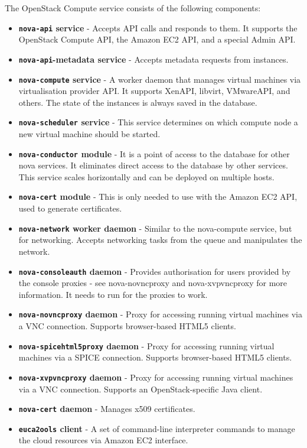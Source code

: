 The OpenStack Compute service consists of the following components:
\begin{itemize}
  \item{\textbf{\texttt{nova-api} service} - Accepts API calls and responds to them. It supports the OpenStack Compute API, the Amazon EC2 API, and a special Admin API.}
  \item{\textbf{\texttt{nova-api}-metadata service} - Accepts metadata requests from instances.}
  \item{\textbf{\texttt{nova-compute} service} - A worker daemon that manages virtual machines via virtualisation provider API. It supports XenAPI, libvirt, VMwareAPI, and others. The state of the instances is always saved in the database.}
  \item{\textbf{\texttt{nova-scheduler} service} - This service determines on which compute node a new virtual machine should be started.}
  \item{\textbf{\texttt{nova-conductor} module} - It is a point of access to the database for other nova services. It eliminates direct access to the database by other services. This service scales horizontally and can be deployed on multiple hosts.}
  \item{\textbf{\texttt{nova-cert} module} - This is only needed to use with the Amazon EC2 API, used to generate certificates.}
  \item{\textbf{\texttt{nova-network} worker daemon} - Similar to the nova-compute service, but for networking. Accepts networking tasks from the queue and manipulates the network.}
  \item{\textbf{\texttt{nova-consoleauth} daemon} - Provides authorisation for users provided by the console proxies - see nova-novncproxy and nova-xvpvncproxy for more information. It needs to run for the proxies to work.}
  \item{\textbf{\texttt{nova-novncproxy} daemon} - Proxy for accessing running virtual machines via a VNC connection. Supports browser-based HTML5 clients.}
  \item{\textbf{\texttt{nova-spicehtml5proxy} daemon} - Proxy for accessing running virtual machines via a SPICE connection. Supports browser-based HTML5 clients.}
  \item{\textbf{\texttt{nova-xvpvncproxy} daemon} - Proxy for accessing running virtual machines via a VNC connection. Supports an OpenStack-specific Java client.}
  \item{\textbf{\texttt{nova-cert} daemon} - Manages x509 certificates.}
  \item{\textbf{\texttt{euca2ools} client} - A set of command-line interpreter commands to manage the cloud resources via Amazon EC2 interface.}

\end{itemize}
